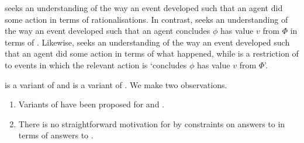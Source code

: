 \begin{note}
  \noindent%
  \qWhyR{} seeks an understanding of the way an event developed such that an agent did some action in terms of rationalisations.
  In contrast, \qWhy{} seeks an understanding of the way an event developed such that an agent concludes \(\phi\) has value \(v\) from \(\Phi\) in terms of \ros{}.
  Likewise, \qHowR{} seeks an understanding of the way an event developed such that an agent did some action in terms of what happened, while \qHow{} is a restriction of \qHowR{} to events in which the relevant action is `concludes \(\phi\) has value \(v\) from \(\Phi\)'.
\end{note}

\begin{note}
  \qWhyR{} is a variant of \qWhy{} and \qHowR{} is a variant of \qHow{}.
  We make two observations.

  \begin{enumerate}
  \item
    Variants of \issueInclusion{} have been proposed for \qWhyR{} and \qHow{}.
  \item
    There is no straightforward motivation for \issueInclusion{} by constraints on answers to \qWhyR{} in terms of answers to \qHow{}.
  \end{enumerate}
\end{note}

